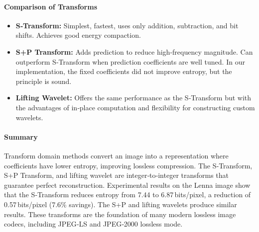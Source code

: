 \paragraph{Comparison of Transforms}
\begin{itemize}
    \item \textbf{S‑Transform:} Simplest, fastest, uses only addition, subtraction, and bit shifts. Achieves good energy compaction.
    \item \textbf{S+P Transform:} Adds prediction to reduce high‑frequency magnitude. Can outperform S‑Transform when prediction coefficients are well tuned. In our implementation, the fixed coefficients did not improve entropy, but the principle is sound.
    \item \textbf{Lifting Wavelet:} Offers the same performance as the S‑Transform but with the advantages of in‑place computation and flexibility for constructing custom wavelets.
\end{itemize}

\paragraph{Summary}
Transform domain methods convert an image into a representation where coefficients have lower entropy, improving lossless compression. The S‑Transform, S+P Transform, and lifting wavelet are integer‑to‑integer transforms that guarantee perfect reconstruction. Experimental results on the Lenna image show that the S‑Transform reduces entropy from 7.44 to 6.87 bits/pixel, a reduction of 0.57 bits/pixel (7.6\% savings). The S+P and lifting wavelets produce similar results. These transforms are the foundation of many modern lossless image codecs, including JPEG‑LS and JPEG‑2000 lossless mode.
